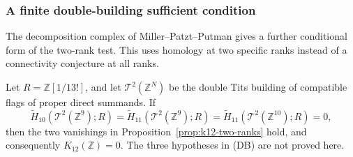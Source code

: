 \subsubsection{A finite double-building sufficient condition}

The decomposition complex of Miller--Patzt--Putman gives a further
conditional form of the two-rank test. This uses homology at two
specific ranks instead of a connectivity conjecture at all ranks.

\begin{proposition}[K17-K12-DOUBLE]\label{prop:k12-double-building}
Let $R=\mathbb Z[1/13!]$, and let $\mathcal T^2(\mathbb Z^N)$
be the double Tits building of compatible flags of proper direct
summands. If
\[
 \widetilde H_{10}(\mathcal T^2(\mathbb Z^9);R)=
 \widetilde H_{11}(\mathcal T^2(\mathbb Z^9);R)=
 \widetilde H_{11}(\mathcal T^2(\mathbb Z^{10});R)=0,
                                                               \tag{DB}
\]
then the two vanishings in Proposition~\ref{prop:k12-two-ranks}
hold, and consequently $K_{12}(\mathbb Z)=0$.
The three hypotheses in \textup{(DB)} are not proved here.
\end{proposition}

